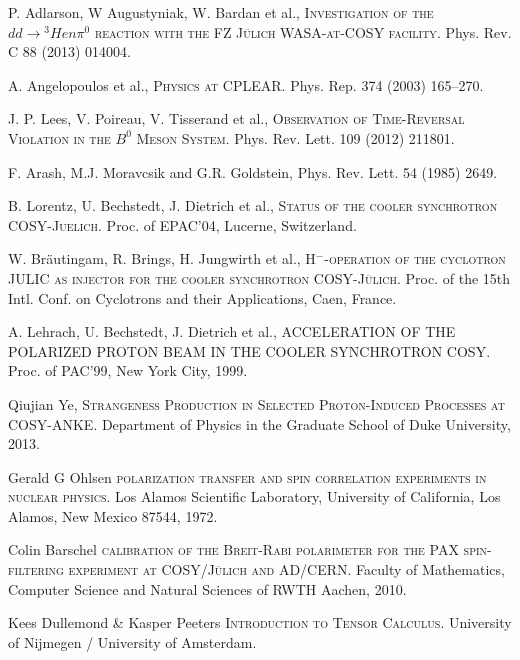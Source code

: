 \documentclass{article}
\begin{document}
\begin{thebibliography}{99}
		P. Adlarson, W Augustyniak, W. Bardan et al.,
		\textsc{Investigation of the $dd \to {}^3He n \pi^0$ reaction with the FZ J\"{u}lich WASA-at-COSY facility}.
		Phys. Rev. C 88 (2013) 014004.
		
		A. Angelopoulos et al.,
		\textsc{Physics at CPLEAR}. 
		Phys. Rep. 374 (2003) 165--270.
		
		J. P. Lees, V. Poireau, V. Tisserand et al.,
		\textsc{Observation of Time-Reversal Violation in the $B^0$ Meson System}.
		Phys. Rev. Lett. 109 (2012) 211801.
		
		F. Arash, M.J. Moravcsik and G.R. Goldstein,
		Phys. Rev. Lett. 54 (1985) 2649.
		
		B. Lorentz, U. Bechstedt, J. Dietrich et al.,
		\textsc{Status of the cooler synchrotron COSY-Juelich}.
		Proc. of EPAC'04, Lucerne, Switzerland.
		
		W. Br\"autingam, R. Brings, H. Jungwirth et al.,
		\textsc{H$^-$-operation of the cyclotron JULIC as injector for the cooler synchrotron COSY-J\"ulich}.
		Proc. of the 15th Intl. Conf. on Cyclotrons and their Applications, Caen, France.
		
		A. Lehrach, U. Bechstedt, J. Dietrich et al.,
		\textsc{ACCELERATION OF THE POLARIZED PROTON BEAM IN THE
			COOLER SYNCHROTRON COSY}.
		Proc. of PAC'99, New York City, 
		1999.
		
		Qiujian Ye,
		\textsc{Strangeness Production in Selected Proton-Induced
			Processes at COSY-ANKE}.
		Department of Physics in the Graduate School of Duke University,
		2013.
		
		Gerald G Ohlsen
		\textsc{polarization transfer and spin correlation experiments in nuclear physics}.
		Los Alamos Scientific Laboratory, University of California, Los Alamos, New Mexico 87544, 
		1972.
		
		Colin Barschel
		\textsc{calibration of the Breit-Rabi polarimeter for the PAX spin-filtering experiment at COSY/J\"ulich and AD/CERN}.
		Faculty of Mathematics, Computer Science and Natural Sciences of RWTH Aachen,
		2010.
		
		
		
		Kees Dullemond \& Kasper Peeters
		\textsc{Introduction to Tensor Calculus}.
		University of Nijmegen / University of Amsterdam.
		

\end{thebibliography}
\end{document}
